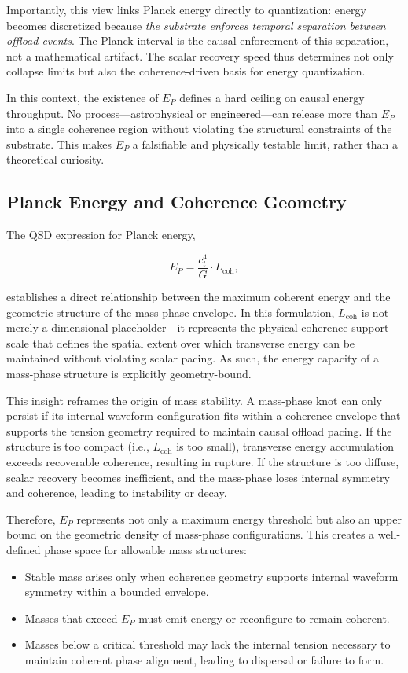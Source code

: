 \documentclass[entropy,article,submit,pdftex,moreauthors]{Definitions/mdpi}
\begin{document}
Importantly, this view links Planck energy directly to quantization: energy becomes discretized because \textit{the substrate enforces temporal separation between offload events}. The Planck interval is the causal enforcement of this separation, not a mathematical artifact. The scalar recovery speed thus determines not only collapse limits but also the coherence-driven basis for energy quantization.

In this context, the existence of $E_P$ defines a hard ceiling on causal energy throughput. No process—astrophysical or engineered—can release more than $E_P$ into a single coherence region without violating the structural constraints of the substrate. This makes $E_P$ a falsifiable and physically testable limit, rather than a theoretical curiosity.

\subsection{Planck Energy and Coherence Geometry}

The QSD expression for Planck energy,

\begin{equation}
E_P = \frac{c_t^4}{G} \cdot L_{\text{coh}},
\end{equation}

establishes a direct relationship between the maximum coherent energy and the geometric structure of the mass-phase envelope. In this formulation, $L_{\text{coh}}$ is not merely a dimensional placeholder—it represents the physical coherence support scale that defines the spatial extent over which transverse energy can be maintained without violating scalar pacing. As such, the energy capacity of a mass-phase structure is explicitly geometry-bound.

This insight reframes the origin of mass stability. A mass-phase knot can only persist if its internal waveform configuration fits within a coherence envelope that supports the tension geometry required to maintain causal offload pacing. If the structure is too compact (i.e., $L_{\text{coh}}$ is too small), transverse energy accumulation exceeds recoverable coherence, resulting in rupture. If the structure is too diffuse, scalar recovery becomes inefficient, and the mass-phase loses internal symmetry and coherence, leading to instability or decay.

Therefore, $E_P$ represents not only a maximum energy threshold but also an upper bound on the geometric density of mass-phase configurations. This creates a well-defined phase space for allowable mass structures:
\begin{itemize}
  \item Stable mass arises only when coherence geometry supports internal waveform symmetry within a bounded envelope.
  \item Masses that exceed $E_P$ must emit energy or reconfigure to remain coherent.
  \item Masses below a critical threshold may lack the internal tension necessary to maintain coherent phase alignment, leading to dispersal or failure to form.
\end{itemize}
\end{document}
